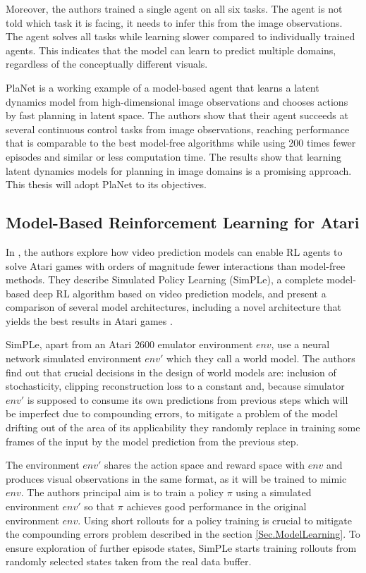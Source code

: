 Moreover, the authors trained a single agent on all six tasks. The agent is not told which task it is facing, it needs to infer this from the image observations. The agent solves all tasks while learning slower compared to individually trained agents. This indicates that the model can learn to predict multiple domains, regardless of the conceptually different visuals.

PlaNet is a working example of a model-based agent that learns a latent dynamics model from high-dimensional image observations and chooses actions by fast planning in latent space. The authors show that their agent succeeds at several continuous control tasks from image observations, reaching performance that is comparable to the best model-free algorithms while using 200 times fewer episodes and similar or less computation time. The results show that learning latent dynamics models for planning in image domains is a promising approach. This thesis will adopt PlaNet to its objectives.

\subsection{Model-Based Reinforcement Learning for Atari}

In \cite{Algo.SimPLe}, the authors explore how video prediction models can enable RL agents to solve Atari games with orders of magnitude fewer interactions than model-free methods. They describe Simulated Policy Learning (SimPLe), a complete model-based deep RL algorithm based on video prediction models, and present a comparison of several model architectures, including a novel architecture that yields the best results in Atari games \cite{Code.ALE}.

SimPLe, apart from an Atari 2600 emulator environment $env$, use a neural network simulated environment $env'$ which they call a world model. The authors find out that crucial decisions in the design of world models are: inclusion of stochasticity, clipping reconstruction loss to a constant and, because simulator $env'$ is supposed to consume its own predictions from previous steps which will be imperfect due to compounding errors, to mitigate a problem of the model drifting out of the area of its applicability they randomly replace in training some frames of the input by the model prediction from the previous step. 

The environment $env'$ shares the action space and reward space with $env$ and produces visual observations in the same format, as it will be trained to mimic $env$. The authors principal aim is to train a policy $\pi$ using a simulated environment $env'$ so that $\pi$ achieves good performance in the original environment $env$. Using short rollouts for a policy training is crucial to mitigate the compounding errors problem described in the section \ref{Sec.ModelLearning}. To ensure exploration of further episode states, SimPLe starts training rollouts from randomly selected states taken from the real data buffer.

